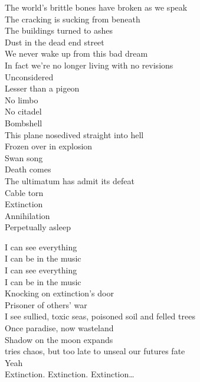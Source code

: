 The world's brittle bones have broken as we speak \\
The cracking  is sucking from beneath \\
The buildings turned to ashes \\
Dust in the dead end street \\
We never wake up from this bad dream \\

In fact we're no longer living with no revisions \\
Unconsidered  \\
Lesser than a pigeon \\
No limbo \\
No citadel \\
Bombshell \\
This plane nosedived straight into hell \\
Frozen over in explosion \\

Swan song \\
Death comes \\
The ultimatum has admit its defeat \\
Cable torn \\
Extinction \\
Annihilation \\
Perpetually asleep \\



I can see everything \\
I can be in the music \\
I can see everything \\
I can be in the music \\

Knocking on extinction's door \\
Prisoner of others' war \\
I see sullied, toxic seas, poisoned soil and felled trees \\
Once paradise, now wasteland \\
Shadow on the moon expands \\
 tries chaos, but too late to unseal our futures fate \\
Yeah \\

Extinction. Extinction. Extinction… \\

